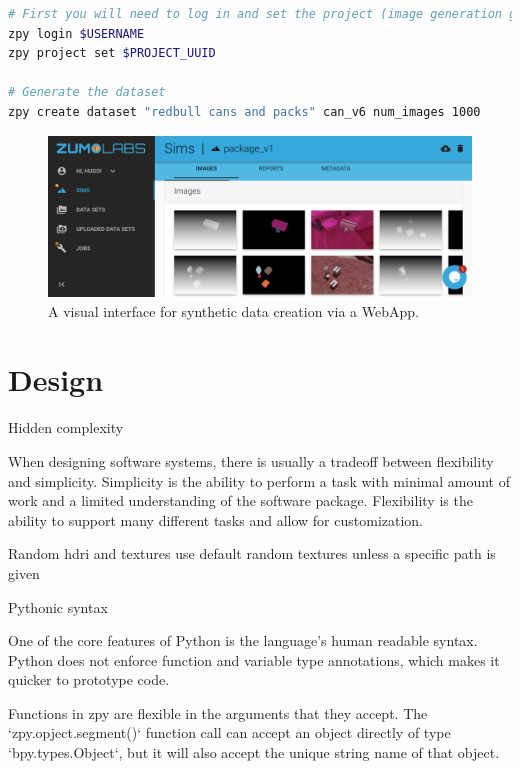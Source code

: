\documentclass{article}
\begin{document}
\begin{lstlisting}[language=bash,caption={Generating a dataset using the zpy CLI},label={lst:cli}]
# First you will need to log in and set the project (image generation gets billed according to project)
zpy login $USERNAME 
zpy project set $PROJECT_UUID

# Generate the dataset
zpy create dataset "redbull cans and packs" can_v6 num_images 1000
\end{lstlisting}

\begin{figure}
	\centering
	\includegraphics[width=\textwidth]{webapp.png}
	\caption{A visual interface for synthetic data creation via a WebApp.}
	\label{fig:webapp}
\end{figure}


\section{Design}
\label{sec:design}

Hidden complexity

When designing software systems, there is usually a tradeoff between flexibility and simplicity. Simplicity is the ability to perform a task with minimal amount of work and a limited understanding of the software package. Flexibility is the ability to support many different tasks and allow for customization.

Random hdri and textures use default random textures unless a specific path is given

Pythonic syntax

One of the core features of Python is the language’s human readable syntax. Python does not enforce function and variable type annotations, which makes it quicker to prototype code.

Functions in zpy are flexible in the arguments that they accept. The `zpy.opject.segment()` function call can accept an object directly of type `bpy.types.Object`, but it will also accept the unique string name of that object. 
\end{document}
